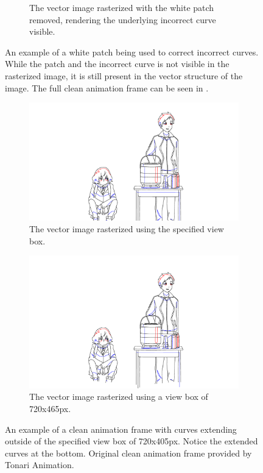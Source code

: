 \begin{figure}
\begin{subfigure}{\textwidth}
        \caption{The vector image rasterized with the white patch removed, rendering the underlying incorrect curve visible.}
    \end{subfigure}
    \caption{An example of a white patch being used to correct incorrect curves. While the patch and the incorrect curve is not visible in the rasterized image, it is still present in the vector structure of the image. The full clean animation frame can be seen in .}
    \label{fig:white-patch}
\end{figure}

\begin{figure}
    \centering
    \begin{subfigure}[t]{.45\textwidth}
    \caption{The vector image rasterized using the specified view box.}
    \includegraphics[width=\textwidth]{graphics/douga/50.pdf}
    \end{subfigure}
    \begin{subfigure}[t]{.45\textwidth}
    \caption{The vector image rasterized using a view box of 720x465px.}
    \includegraphics[width=\textwidth]{graphics/douga/50_extended_height.pdf}
    \end{subfigure}
    \caption{An example of a clean animation frame with curves extending outside of the specified view box of 720x405px. Notice the extended curves at the bottom. Original clean animation frame provided by Tonari Animation.}
    \label{fig:50_extended_height}
\end{figure}

